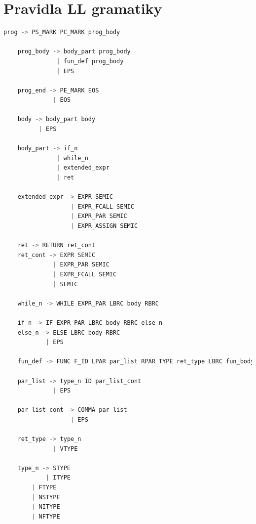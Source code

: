 \documentclass[a4paper, 11pt]{article}
\begin{document}
	\begingroup\centering
	\section*{Pravidla LL gramatiky}
	\label{gram}
	\endgroup
	\begin{lstlisting}[language=Python]
	prog -> PS_MARK PC_MARK prog_body

	prog_body -> body_part prog_body
	           | fun_def prog_body
	           | EPS
	
	prog_end -> PE_MARK EOS
	          | EOS
	
	body -> body_part body
	      | EPS
	
	body_part -> if_n
	           | while_n
	           | extended_expr
	           | ret
	
	extended_expr -> EXPR SEMIC 
	               | EXPR_FCALL SEMIC
	               | EXPR_PAR SEMIC
	               | EXPR_ASSIGN SEMIC
	
	ret -> RETURN ret_cont
	ret_cont -> EXPR SEMIC
	          | EXPR_PAR SEMIC
	          | EXPR_FCALL SEMIC
	          | SEMIC
	
	while_n -> WHILE EXPR_PAR LBRC body RBRC
	
	if_n -> IF EXPR_PAR LBRC body RBRC else_n
	else_n -> ELSE LBRC body RBRC
	        | EPS
		  
	fun_def -> FUNC F_ID LPAR par_list RPAR TYPE ret_type LBRC fun_body RBRC
	
	par_list -> type_n ID par_list_cont
	          | EPS
	
	par_list_cont -> COMMA par_list
	               | EPS
				
	ret_type -> type_n
	          | VTYPE
	
	type_n -> STYPE
	        | ITYPE
		| FTYPE
		| NSTYPE
		| NITYPE
		| NFTYPE

	\end{lstlisting}

\end{document}
